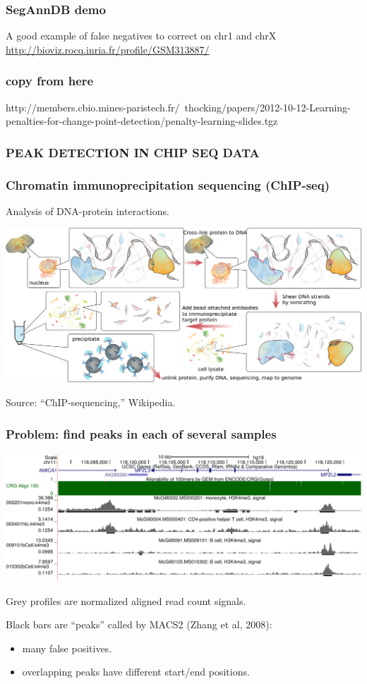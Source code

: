 \documentclass{beamer}
\begin{document}
\begin{frame}
  \frametitle{SegAnnDB demo}
    A good example of false negatives to correct on chr1 and chrX
  \url{http://bioviz.rocq.inria.fr/profile/GSM313887/}
\end{frame}

\begin{frame}
  \frametitle{copy from here}
  http://members.cbio.mines-paristech.fr/~thocking/papers/2012-10-12-Learning-penalties-for-change-point-detection/penalty-learning-slides.tgz
\end{frame}

\begin{frame}
  \frametitle{PEAK DETECTION IN CHIP SEQ DATA}
  
\end{frame}

\begin{frame}
  \frametitle{Chromatin immunoprecipitation sequencing (ChIP-seq)}
  Analysis of DNA-protein interactions.

  \includegraphics[width=\textwidth]{Chromatin_immunoprecipitation_sequencing_wide.png}

  Source: ``ChIP-sequencing,'' Wikipedia.
\end{frame}

\begin{frame}
  \frametitle{Problem: find peaks in each of several samples}
  \includegraphics[width=\textwidth]{screenshot-ucsc-edited}

  Grey profiles are normalized aligned read count signals.

  Black bars are ``peaks'' called by MACS2 (Zhang et al, 2008):
  \begin{itemize}
  \item many false positives.
  \item overlapping peaks have different start/end positions.
  \end{itemize}
\end{frame}
\end{document}
